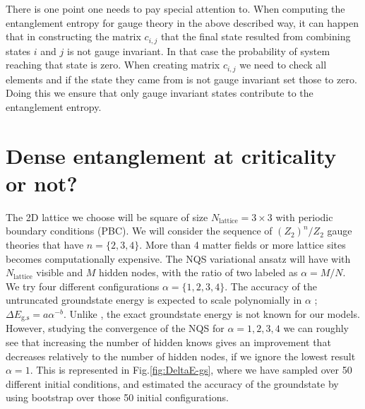 	There is one point one needs to pay special attention to.
	When computing the entanglement entropy for gauge theory in the above described way, it can happen that in constructing the matrix $c_{i,j}$ that the final state resulted from combining states $i$ and $j$ is not gauge invariant. In that case the probability of system reaching that state is zero. When creating matrix $c_{i,j}$ we need to check all elements and if the state they came from is not gauge invariant set those to zero. Doing this we ensure that only gauge invariant states contribute to the entanglement entropy. 
	
	
	\section{Dense entanglement at criticality or not?}
	
	The 2D lattice we choose will be square of size $N_{\text{lattice}}=3\times 3$ with periodic boundary conditions (PBC). We will consider the sequence of $(Z_2)^n/Z_2$ gauge theories that have $n=\{2,3,4\}$. 
	More than 4 matter fields or more lattice sites becomes computationally expensive. The NQS variational ansatz will have with $N_{\text{lattice}}$ visible and $M$ hidden nodes, with the ratio of two labeled as $\alpha = M/N$. We try four different configurations $\alpha =\{1,2,3,4\}$. The accuracy of the untruncated groundstate energy is expected to scale polynomially in $\alpha$ \cite{Evenbly2013}; $\Delta E_{\text{g.s}} = a\alpha^{-b}$. Unlike \cite{Evenbly2013}, the exact groundstate energy is not known for our models. However, studying the convergence of the NQS for $\alpha=1,2,3,4$ we can roughly see that increasing the number of hidden knows gives an improvement that decreases relatively to the number of hidden nodes, if we ignore the lowest result $\alpha=1$. This is represented in Fig.\ref{fig:DeltaE-gs}, where we
	have sampled over 50 different initial conditions, and estimated the accuracy of the groundstate by using bootstrap over those 50 initial configurations.
	
